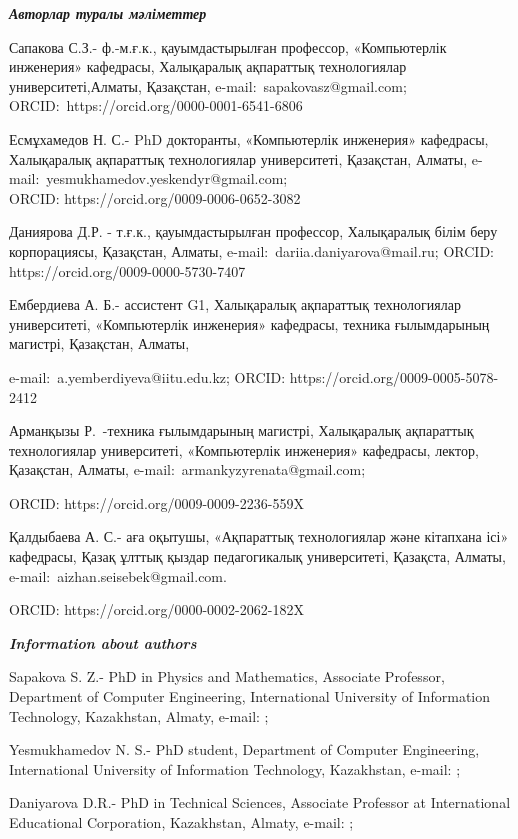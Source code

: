 \emph{{\bfseries Авторлар туралы мәліметтер}}

Сапакова С.З.- ф.-м.ғ.к., қауымдастырылған профессор, «Компьютерлік
инженерия» кафедрасы, Халықаралық ақпараттық технологиялар
университеті,Алматы, Қазақстан, e-mail:~sapakovasz@gmail.com;
ORCID:~https://orcid.org/0000-0001-6541-6806

Есмұхамедов Н. С.- PhD докторанты, «Компьютерлік инженерия» кафедрасы,
Халықаралық ақпараттық технологиялар университеті, Қазақстан, Алматы,
e-mail:~yesmukhamedov.yeskendyr@gmail.com;\\
ORCID: https://orcid.org/0009-0006-0652-3082

Даниярова Д.Р. - т.ғ.к., қауымдастырылған профессор, Халықаралық білім
беру корпорациясы, Қазақстан, Алматы, e-mail:~dariia.daniyarova@mail.ru;
ORCID: https://orcid.org/0009-0000-5730-7407

Ембердиева А. Б.- ассистент G1, Халықаралық ақпараттық технологиялар
университеті, «Компьютерлік инженерия» кафедрасы, техника ғылымдарының
магистрі, Қазақстан, Алматы,

e-mail:~a.yemberdiyeva@iitu.edu.kz; ORCID:
https://orcid.org/0009-0005-5078-2412

Арманқызы Р.~-техника ғылымдарының магистрі, Халықаралық ақпараттық
технологиялар университеті, «Компьютерлік инженерия» кафедрасы, лектор,
Қазақстан, Алматы, e-mail:~armankyzyrenata@gmail.com;

ORCID: https://orcid.org/0009-0009-2236-559X

Қалдыбаева А. С.- аға оқытушы, «Ақпараттық технологиялар және кітапхана
ісі» кафедрасы, Қазақ ұлттық қыздар педагогикалық университеті,
Қазақста, Алматы, e-mail:~aizhan.seisebek@gmail.com.

ORCID: https://orcid.org/0000-0002-2062-182X

\emph{{\bfseries Information about authors}}

Sapakova S. Z.- PhD in Physics and Mathematics, Associate Professor,
Department of Computer Engineering, International University of
Information Technology, Kazakhstan, Almaty, e-mail:
\href{mailto:sapakovasz@gmail.com}{};

Yesmukhamedov N. S.- PhD student, Department of Computer Engineering,
International University of Information Technology, Kazakhstan, e-mail:
\href{mailto:yesmukhamedov.yeskendyr@gmail.com}{};

Daniyarova D.R.- PhD in Technical Sciences, Associate Professor at
International Educational Corporation, Kazakhstan, Almaty, e-mail:
\href{mailto:dariia.daniyarova@mail.ru}{};

